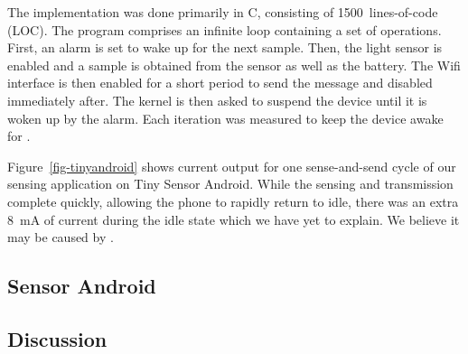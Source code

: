 The implementation was done primarily in C, consisting of 1500~lines-of-code
(LOC). The program comprises an infinite loop containing a set of operations. 
First, an alarm is set to wake up for the next sample. Then, the light
sensor is enabled and a sample is obtained from the sensor as well as the
battery. The Wifi interface is then enabled for a short period to send the
message and disabled immediately after. The kernel is then asked to suspend the
device until it is woken up by the alarm.
Each iteration was measured to keep the device awake for .

Figure~\ref{fig-tinyandroid} shows current output for one sense-and-send
cycle of our sensing application on Tiny Sensor Android. While the sensing
and transmission complete quickly, allowing the phone to rapidly return to
idle, there was an extra 8~mA of current during the idle state which we have
yet to explain. We believe it may be caused by .

\subsection{Sensor Android}
\label{subsec-full}


\subsection{Discussion}

